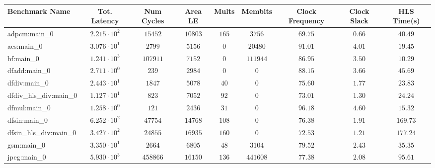 \begin{tabular}{|l|c|c|c|c|c|c|c|c|}
\hline
Benchmark Name          & Tot. Latency           & Num Cycles & Area LE    & Mults   & Membits    & Clock Frequency & Clock Slack & HLS Time(s) \\
\hline
adpcm:main\_0           & $ 2.215 \cdot 10^{2} $ & $ 15452  $ & $ 10803  $ & $ 165 $ & $ 3756   $ & $ 69.75       $ & $ 0.66    $ & $ 40.49   $ \\
aes:main\_0             & $ 3.076 \cdot 10^{1} $ & $ 2799   $ & $ 5156   $ & $ 0   $ & $ 20480  $ & $ 91.01       $ & $ 4.01    $ & $ 19.45   $ \\
bf:main\_0              & $ 1.241 \cdot 10^{3} $ & $ 107911 $ & $ 7152   $ & $ 0   $ & $ 111944 $ & $ 86.95       $ & $ 3.50    $ & $ 10.29   $ \\
dfadd:main\_0           & $ 2.711 \cdot 10^{0} $ & $ 239    $ & $ 2984   $ & $ 0   $ & $ 0      $ & $ 88.15       $ & $ 3.66    $ & $ 45.69   $ \\
dfdiv:main\_0           & $ 2.443 \cdot 10^{1} $ & $ 1847   $ & $ 5078   $ & $ 40  $ & $ 0      $ & $ 75.60       $ & $ 1.77    $ & $ 23.83   $ \\
dfdiv\_hls\_div:main\_0 & $ 1.127 \cdot 10^{1} $ & $ 823    $ & $ 7052   $ & $ 92  $ & $ 0      $ & $ 73.01       $ & $ 1.30    $ & $ 24.24   $ \\
dfmul:main\_0           & $ 1.258 \cdot 10^{0} $ & $ 121    $ & $ 2436   $ & $ 31  $ & $ 0      $ & $ 96.18       $ & $ 4.60    $ & $ 15.32   $ \\
dfsin:main\_0           & $ 6.252 \cdot 10^{2} $ & $ 47754  $ & $ 14768  $ & $ 108 $ & $ 0      $ & $ 76.38       $ & $ 1.91    $ & $ 169.73  $ \\
dfsin\_hls\_div:main\_0 & $ 3.427 \cdot 10^{2} $ & $ 24855  $ & $ 16935  $ & $ 160 $ & $ 0      $ & $ 72.53       $ & $ 1.21    $ & $ 177.24  $ \\
gsm:main\_0             & $ 3.350 \cdot 10^{1} $ & $ 2664   $ & $ 6805   $ & $ 48  $ & $ 3104   $ & $ 79.52       $ & $ 2.43    $ & $ 35.35   $ \\
jpeg:main\_0            & $ 5.930 \cdot 10^{3} $ & $ 458866 $ & $ 16150  $ & $ 136 $ & $ 441608 $ & $ 77.38       $ & $ 2.08    $ & $ 95.61   $ \\

\end{tabular}
